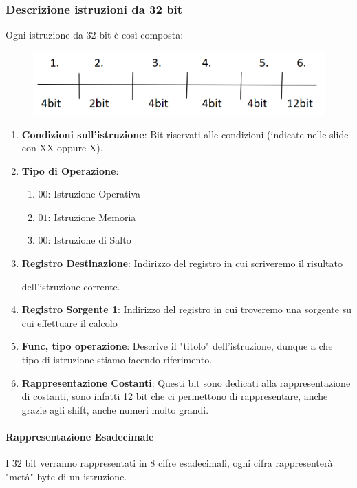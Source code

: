 \documentclass{article}
\begin{document}
\newpage

\subsubsection{Descrizione istruzioni da 32 bit}

Ogni istruzione da 32 bit è così composta:

\begin{figure}[htbp]
        \center
        \includegraphics[scale=0.45]{img/istruzione_32bit.png}
    \end{figure}

\begin{enumerate}
    \item \textbf{Condizioni sull'istruzione}: Bit riservati alle condizioni (indicate nelle slide con XX oppure X).
    \item \textbf{Tipo di Operazione}:
    \begin{enumerate}
        \item \textbf{$00$}: Istruzione Operativa
        \item \textbf{$01$}: Istruzione Memoria
        \item \textbf{$00$}: Istruzione di Salto
    \end{enumerate}
    \item \textbf{Registro Destinazione}: Indirizzo del registro in cui scriveremo il risultato 
    
    dell'istruzione corrente.
    \item \textbf{Registro Sorgente 1}: Indirizzo del registro in cui troveremo una sorgente su cui effettuare il calcolo
    \item \textbf{Func, tipo operazione}: Descrive il "titolo" dell'istruzione, dunque a che tipo di istruzione stiamo facendo riferimento.
    \item \textbf{Rappresentazione Costanti}: Questi bit sono dedicati alla rappresentazione di costanti, sono infatti 12 bit che ci permettono di rappresentare, anche grazie agli shift, anche numeri molto grandi.
\end{enumerate}

\paragraph{Rappresentazione Esadecimale} I $32$ bit verranno rappresentati in $8$ cifre esadecimali, ogni cifra rappresenterà "metà" byte di un istruzione.
\end{document}
